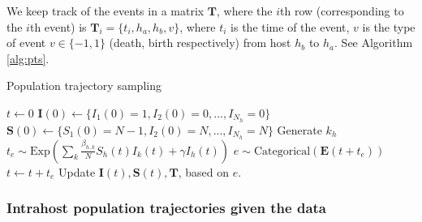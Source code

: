 \documentclass[a4paper,18pt]{report}
\begin{document}
We keep track of the events in a matrix $\mathbf{T}$, where the $i$th row (corresponding to the $i$th event) is $\mathbf{T}_i=\{t_i, h_a, h_b, v\}$, where $t_i$ is the time of the event,
$v$ is the type of event $v \in \{-1,1\}$ (death, birth respectively) from host $h_b$ to $h_a$. See Algorithm \ref{alg:pts}.
\begin{algorithm}
\caption{Population trajectory sampling \label{alg:pts}}
\begin{algorithmic}
\STATE $t\gets 0$
\STATE $\mathbf{I}(0)\gets\{I_1(0)=1, I_2(0)=0, ..., I_{N_h}=0\}$
\STATE $\mathbf{S}(0)\gets\{S_1(0)=N-1, I_2(0)=N, ..., I_{N_h}=N\}$
\STATE Generate $k_h$
\STATE $t_e \sim \textrm{Exp}(\sum_k \frac{\beta_{h,k}}{N}S_h(t)I_k(t) + \gamma I_h(t))$ 
\STATE $e \sim \text{Categorical}(\mathbf{E}(t+t_e))$  
\STATE $t \gets t+t_e$
\STATE Update $\mathbf{I}(t), \mathbf{S}(t), \mathbf{T}$, based on $e$.
\ENDWHILE
\end{algorithmic}
\end{algorithm}

\subsubsection{Intrahost population trajectories given the data}
\end{document}
